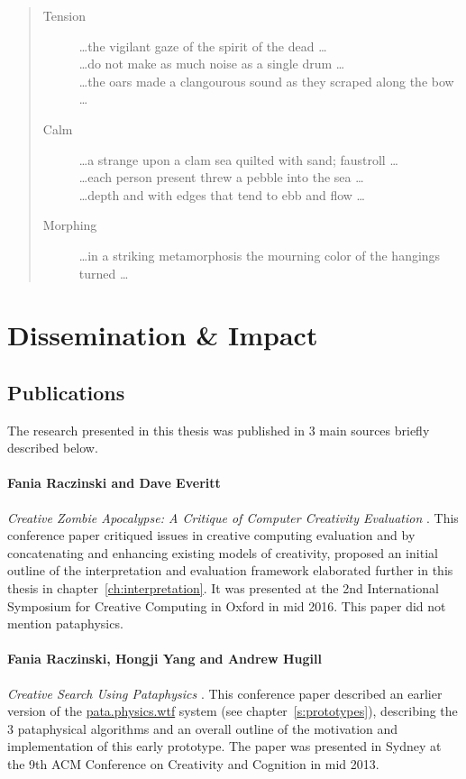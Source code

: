 \begin{quotation}
\begin{description}
  \item [Tension] \ldots the vigilant gaze of the spirit of the dead \ldots \\ \ldots do not make as much noise as a single drum \ldots \\ \ldots the oars made a clangourous sound as they scraped along the bow \ldots
  \item [Calm] \ldots a strange upon a clam sea quilted with sand; faustroll \ldots \\ \ldots each person present threw a pebble into the sea \ldots \\ \ldots depth and with edges that tend to ebb and flow \ldots 
  \item [Morphing] \ldots in a striking metamorphosis the mourning color of the hangings turned \ldots 
\end{description}
\end{quotation}


\section{Dissemination \& Impact}


\subsection{Publications}

The research presented in this thesis was published in 3 main sources briefly described below.

\paragraph{Fania Raczinski and Dave Everitt} \textit{Creative Zombie Apocalypse: A Critique of Computer Creativity Evaluation} \citeyear{Raczinski2016}. This conference paper critiqued issues in creative computing evaluation and by concatenating and enhancing existing models of creativity, proposed an initial outline of the interpretation and evaluation framework elaborated further in this thesis in chapter~\ref{ch:interpretation}. It was presented at the 2nd International Symposium for Creative Computing in Oxford in mid 2016. This paper did not mention pataphysics.

\paragraph{Fania Raczinski, Hongji Yang and Andrew Hugill} \textit{Creative Search Using Pataphysics} \citeyear{Raczinski2013}. This conference paper described an earlier version of the \url{pata.physics.wtf} system (see chapter~\ref{s:prototypes}), describing the 3 pataphysical algorithms and an overall outline of the motivation and implementation of this early prototype. The paper was presented in Sydney at the 9th ACM Conference on Creativity and Cognition in mid 2013.

